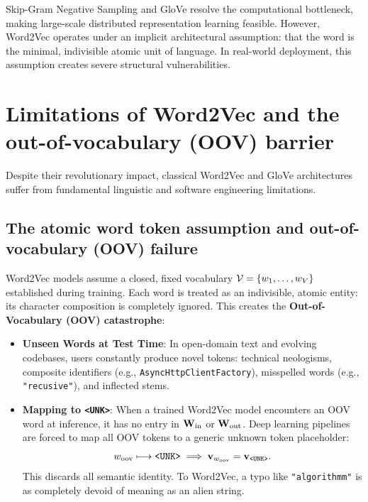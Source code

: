 \documentclass[../../main.tex]{subfiles}
\begin{document}
Skip-Gram Negative Sampling and GloVe resolve the computational bottleneck, making large-scale distributed representation learning feasible. However, Word2Vec operates under an implicit architectural assumption: that the word is the minimal, indivisible atomic unit of language. In real-world deployment, this assumption creates severe structural vulnerabilities.

\clearpage
\section{Limitations of Word2Vec and the out-of-vocabulary (OOV) barrier}
\label{sec:word2vec_limitations}

Despite their revolutionary impact, classical Word2Vec and GloVe architectures suffer from fundamental linguistic and software engineering limitations.

\subsection{The atomic word token assumption and out-of-vocabulary (OOV) failure}
\label{subsec:oov_barrier}

Word2Vec models assume a closed, fixed vocabulary $\mathcal{V} = \{w_1, \dots, w_V\}$ established during training. Each word is treated as an indivisible, atomic entity: its character composition is completely ignored. This creates the \textbf{Out-of-Vocabulary (OOV) catastrophe}:
\begin{itemize}
    \item \textbf{Unseen Words at Test Time}: In open-domain text and evolving codebases, users constantly produce novel tokens: technical neologisms, composite identifiers (e.g., \texttt{AsyncHttpClientFactory}), misspelled words (e.g., \texttt{"recusive"}), and inflected stems.
    \item \textbf{Mapping to \texttt{<UNK>}}: When a trained Word2Vec model encounters an OOV word at inference, it has no entry in $\mathbf{W}_{\text{in}}$ or $\mathbf{W}_{\text{out}}$. Deep learning pipelines are forced to map all OOV tokens to a generic unknown token placeholder:
    \begin{equation}
    \label{eq:unk_collapse}
    w_{\text{oov}} \longmapsto \text{\texttt{<UNK>}} \implies \mathbf{v}_{w_{\text{oov}}} = \mathbf{v}_{\text{\texttt{<UNK>}}}.
    \end{equation}
    This discards all semantic identity. To Word2Vec, a typo like \texttt{"algorithmm"} is as completely devoid of meaning as an alien string.
\end{itemize}
\end{document}

